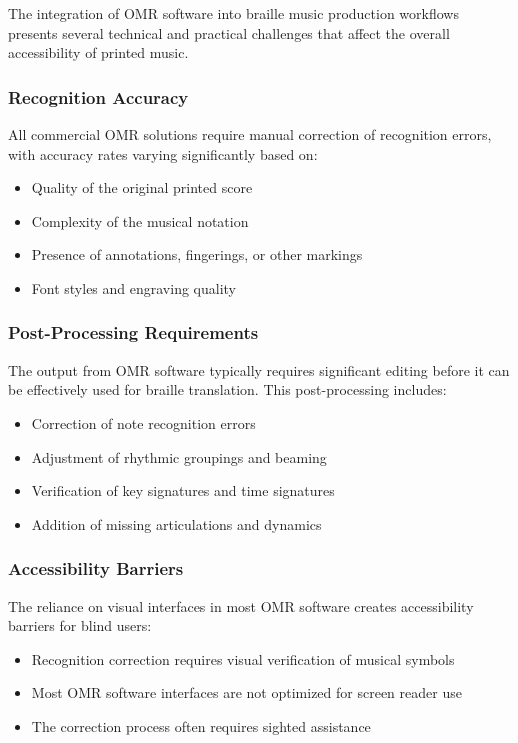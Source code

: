 The integration of OMR software into braille music production workflows presents several technical and practical challenges that affect the overall accessibility of printed music.

\subsubsection{Recognition Accuracy}
All commercial OMR solutions require manual correction of recognition errors, with accuracy rates varying significantly based on:
\begin{itemize}
    \item Quality of the original printed score
    \item Complexity of the musical notation
    \item Presence of annotations, fingerings, or other markings
    \item Font styles and engraving quality
\end{itemize}

\subsubsection{Post-Processing Requirements}
The output from OMR software typically requires significant editing before it can be effectively used for braille translation. This post-processing includes:
\begin{itemize}
    \item Correction of note recognition errors
    \item Adjustment of rhythmic groupings and beaming
    \item Verification of key signatures and time signatures
    \item Addition of missing articulations and dynamics
\end{itemize}

\subsubsection{Accessibility Barriers}
The reliance on visual interfaces in most OMR software creates accessibility barriers for blind users:
\begin{itemize}
    \item Recognition correction requires visual verification of musical symbols
    \item Most OMR software interfaces are not optimized for screen reader use
    \item The correction process often requires sighted assistance
\end{itemize}


